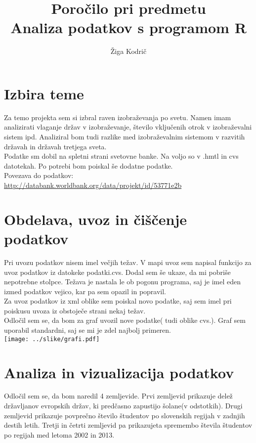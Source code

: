 \documentclass[11pt,a4paper]{article}
\begin{document}
\title{Poročilo pri predmetu \\
Analiza podatkov s programom R}
\author{Žiga Kodrič}
\maketitle

\section{Izbira teme}
Za temo projekta sem si izbral raven izobraževanja po svetu. Namen imam analizirati vlaganje držav v izobraževanje, število vključenih otrok v izobraževalni sistem ipd. Analiziral bom tudi razlike med izobraževalnim sistemom v razvitih državah in državah tretjega sveta.
\\
Podatke sm dobil na spletni strani svetovne banke. Na voljo so v .hmtl in cvs datotekah. Po potrebi bom poiskal še dodatne podatke.
\\
Povezava do podatkov: \url{http://databank.worldbank.org/data/projekt/id/53771e2b}
\section{Obdelava, uvoz in čiščenje podatkov}
Pri uvozu podatkov nisem imel večjih težav. V mapi uvoz sem napisal funkcijo za uvoz podatkov iz datokeke podatki.cvs. Dodal sem še ukaze, da mi pobriše nepotrebne stolpce. Težava je nastala le ob pogonu programa, saj je imel eden izmed podatkov vejico, kar pa sem opazil in popravil. \\
Za uvoz podatkov iz xml oblike sem poiskal novo podatke, saj sem imel pri poiskusu uvoza iz obstoječe strani nekaj težav. \\
Odločil sem se, da bom za graf uvozil nove podatke( tudi oblike cvs.). Graf sem uporabil standardni, saj se mi je zdel najbolj primeren.
\\
\texttt{[image: ../slike/grafi.pdf]}
\section{Analiza in vizualizacija podatkov}
Odločil sem se, da bom naredil 4 zemljevide. Prvi zemljevid prikazuje delež državljanov evropskih držav, ki predčasno zapustijo šolane(v odstotkih). Drugi zemljevid prikazuje povprečno število študentov po slovenskih regijah v zadnjih destih letih. Tretji in četrti zemljevid pa prikazujeta spremembo števila študentov po regijah med letoma 2002 in 2013.
\end{document}
